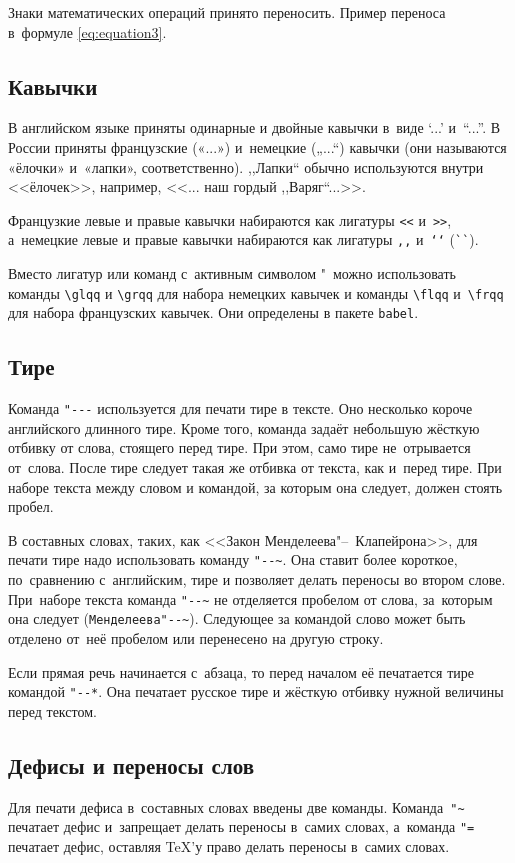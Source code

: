 Знаки математических операций принято переносить. Пример переноса
в~формуле \eqref{eq:equation3}.

\subsection{Кавычки}
В английском языке приняты одинарные и двойные кавычки в~виде ‘...’ и~“...”.
В России приняты французские («...») и~немецкие („...“) кавычки (они называются
«ёлочки» и~«лапки», соответственно). ,,Лапки`` обычно используются внутри
<<ёлочек>>, например, <<... наш гордый ,,Варяг``...>>.

Французкие левые и правые кавычки набираются
как лигатуры \verb|<<| и~\verb|>>|, а~немецкие левые
и правые кавычки набираются как лигатуры \verb|,,| и~\verb|‘‘| (\verb|``|).

Вместо лигатур или команд с~активным символом "\ можно использовать команды
\verb|\glqq| и \verb|\grqq| для набора немецких кавычек и команды \verb|\flqq|
и~\verb|\frqq| для набора французских кавычек. Они определены в пакете
\verb|babel|.

\subsection{Тире}
Команда \verb|"---| используется для печати тире в тексте. Оно несколько короче
английского длинного тире. Кроме того, команда задаёт небольшую жёсткую отбивку
от слова, стоящего перед тире. При этом, само тире не~отрывается от~слова.
После тире следует такая же отбивка от текста, как и~перед тире. При наборе
текста между словом и командой, за которым она следует, должен стоять пробел.

В составных словах, таких, как <<Закон Менделеева"--~Клапейрона>>, для печати
тире надо использовать команду \verb|"--~|. Она ставит более короткое,
по~сравнению с~английским, тире и позволяет делать переносы во втором слове.
При~наборе текста команда \verb|"--~| не отделяется пробелом от слова,
за~которым она следует (\verb|Менделеева"--~|). Следующее за командой слово
может быть  отделено от~неё пробелом или перенесено на другую строку.

Если прямая речь начинается с~абзаца, то перед началом её печатается тире
командой \verb|"--*|. Она печатает русское тире и жёсткую отбивку нужной
величины перед текстом.

\subsection{Дефисы и переносы слов}
Для печати дефиса в~составных словах введены две команды. Команда~\verb|"~|
печатает дефис и~запрещает делать переносы в~самих словах, а~команда \verb|"=|
печатает дефис, оставляя \TeX ’у право делать переносы в~самих словах.

